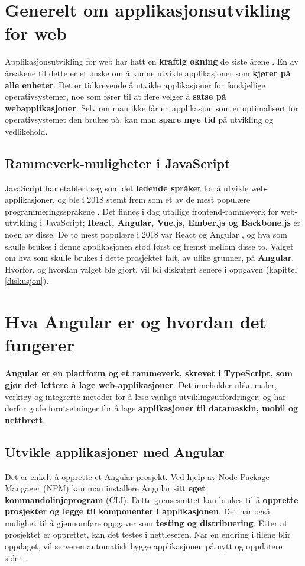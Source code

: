 \section{Generelt om applikasjonsutvikling for web}
Applikasjonsutvikling for web har hatt en \textbf{kraftig økning} de siste årene \cite{jsFrameworks}. En av årsakene til dette er et ønske om å kunne utvikle applikasjoner som \textbf{kjører på alle enheter}. Det er tidkrevende å utvikle applikasjoner for forskjellige operativsystemer, noe som fører til at flere velger å \textbf{satse på webapplikasjoner}. Selv om man ikke får en applikasjon som er optimalisert for operativsystemet den brukes på, kan man \textbf{spare mye tid} på utvikling og vedlikehold.

\subsection{Rammeverk-muligheter i JavaScript}
JavaScript har etablert seg som det \textbf{ledende språket} for å utvikle web-applikasjoner, og ble i 2018 stemt frem som et av de mest populære programmeringsspråkene \cite{developerSurvey}. Det finnes i dag utallige frontend-rammeverk for web-utvikling i JavaScript; \textbf{React, Angular, Vue.js, Ember.js og Backbone.js} er noen av disse. De to mest populære i 2018 var React og Angular \cite{jsFrameworks}, og hva som skulle brukes i denne applikasjonen stod først og fremst mellom disse to. Valget om hva som skulle brukes i dette prosjektet falt, av ulike grunner, på \textbf{Angular}. Hvorfor, og hvordan valget ble gjort, vil bli diskutert senere i oppgaven (kapittel \ref{diskusjon}).

\section{Hva Angular er og hvordan det fungerer}
\textbf{Angular er en plattform og et rammeverk, skrevet i TypeScript, som gjør det lettere å lage web-applikasjoner}. Det inneholder ulike maler, verktøy og integrerte metoder for å løse vanlige utviklingsutfordringer, og har derfor gode forutsetninger for å lage \textbf{applikasjoner til datamaskin, mobil og nettbrett}.

\subsection{Utvikle applikasjoner med Angular}
Det er enkelt å opprette et Angular-prosjekt. Ved hjelp av Node Package Mangager (NPM) kan man installere Angular sitt \textbf{eget kommandolinjeprogram} (CLI). Dette grensesnittet kan brukes til å \textbf{opprette prosjekter og legge til komponenter i applikasjonen}. Det har også mulighet til å gjennomføre oppgaver som \textbf{testing og distribuering}. Etter at prosjektet er opprettet, kan det testes i nettleseren. Når en endring i filene blir oppdaget, vil serveren automatisk bygge applikasjonen på nytt og oppdatere siden \cite{AngularInBrowser}.

